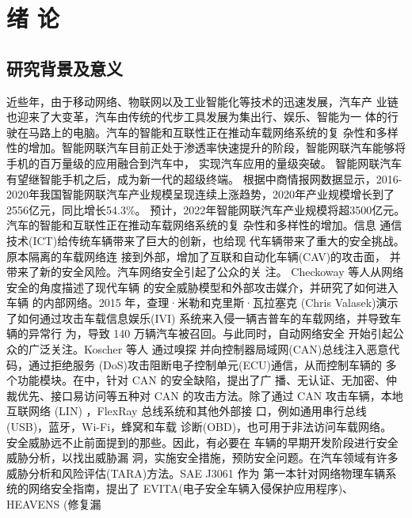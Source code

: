 \chapter{绪\hskip 0.4cm 论}
\label{ch1}
\section{研究背景及意义}
近些年，由于移动网络、物联网以及工业智能化等技术的迅速发展，汽车产
业链也迎来了大变革，汽车由传统的代步工具发展为集出行、娱乐、智能为一
体的行驶在马路上的电脑。汽车的智能和互联性正在推动车载网络系统的复
杂性和多样性的增加。智能网联汽车目前正处于渗透率快速提升的阶段，智能网联汽车能够将手机的百万量级的应用融合到汽车中，
实现汽车应用的量级突破。
智能网联汽车有望继智能手机之后，成为新一代的超级终端。
根据中商情报网数据显示\cite{zhao}，2016-2020年我国智能网联汽车产业规模呈现连续上涨趋势，2020年产业规模增长到了2556亿元，同比增长54.3\%。
预计，2022年智能网联汽车产业规模将超3500亿元。
\newline
汽车的智能和互联性正在推动车载网络系统的复
杂性和多样性的增加。信息
通信技术(ICT)给传统车辆带来了巨大的创新，也给现
代车辆带来了重大的安全挑战。原本隔离的车载网络连
接到外部，增加了互联和自动化车辆(CAV)的攻击面，
并带来了新的安全风险。汽车网络安全引起了公众的关
注。
\newline
Checkoway 等人\cite{checkoway2011comprehensive}从网络安全的角度描述了现代车辆
的安全威胁模型和外部攻击媒介，并研究了如何进入车辆
的内部网络。2015 年，查理·米勒和克里斯·瓦拉塞克
(Chris Valasek)演示了如何通过攻击车载信息娱乐(IVI)
系统来入侵一辆吉普车的车载网络，并导致车辆的异常行
为，导致 140 万辆汽车被召回。与此同时，自动网络安全
开始引起公众的广泛关注\cite{miller2015remote}。Koscher 等人 \cite{koscher2010experimental} 通过嗅探
并向控制器局域网(CAN)总线注入恶意代码，通过拒绝服务
(DoS)攻击阻断电子控制单元(ECU)通信，从而控制车辆的
多个功能模块。在\cite{liu2017vehicle}中，针对 CAN 的安全缺陷，提出了广
播、无认证、无加密、仲裁优先、接口易访问等五种对
CAN 的攻击方法。除了通过 CAN 攻击车辆，本地互联网络
(LIN) \cite{deng2017security}，FlexRay \cite{takahashi2017automotive} \cite{gu2016security} 总线系统和其他外部接
口，例如通用串行总线(USB)，蓝牙，Wi-Fi，蜂窝和车载
诊断(OBD)，也可用于非法访问车载网络\cite{mousa2016lightweight}。
\newline
安全威胁远不止前面提到的那些。因此，有必要在
车辆的早期开发阶段进行安全威胁分析，以找出威胁漏
洞，实施安全措施，预防安全问题。在汽车领域有许多
威胁分析和风险评估(TARA)方法。SAE J3061
\cite{sae2016cybersecurity}作为
第一本针对网络物理车辆系统的网络安全指南，提出了
EVITA(电子安全车辆入侵保护应用程序)、HEAVENS (修复漏

